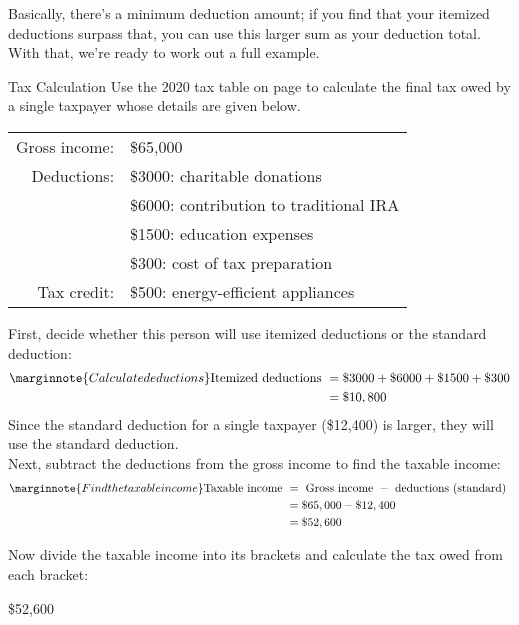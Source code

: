 Basically, there's a minimum deduction amount; if you find that your itemized deductions surpass that, you can use this larger sum as your deduction total.\\

With that, we're ready to work out a full example.
\begin{example}[https://www.youtube.com/watch?v=ls2UbXuadrw&list=PLfmpjsIzhztsZtnb7HnXrQ8SLoiOCIcAM&index=45]{Tax Calculation}
Use the 2020 tax table on page \pageref{Tax Table} to calculate the final tax owed by a single taxpayer whose details are given below.
\begin{center}
\begin{tabular}{r l}
Gross income: & \$65,000\\
Deductions: & \$3000: charitable donations\\
& \$6000: contribution to traditional IRA\\
& \$1500: education expenses\\
& \$300: cost of tax preparation\\
Tax credit: & \$500: energy-efficient appliances
\end{tabular}
\end{center}

\sol
First, decide whether this person will use itemized deductions or the standard deduction:
\begin{align*}
\marginnote{Calculate deductions}
\textrm{Itemized deductions } &= \$3000 + \$6000 + \$1500 + \$300\\
&= \$10,800
\end{align*}
Since the standard deduction for a single taxpayer (\$12,400) is larger, they will use the standard deduction.\\

Next, subtract the deductions from the gross income to find the taxable income:
\begin{align*}\marginnote{Find the taxable income}
\textrm{Taxable income } &= \textrm{ Gross income } - \textrm{ deductions (standard) }\\
&= \$65,000 - \$12,400\\
&= \$52,600
\end{align*}
\pagebreak

Now divide the taxable income into its brackets and calculate the tax owed from each bracket:
\begin{center}
\$52,600


\end{center}
\end{example}
